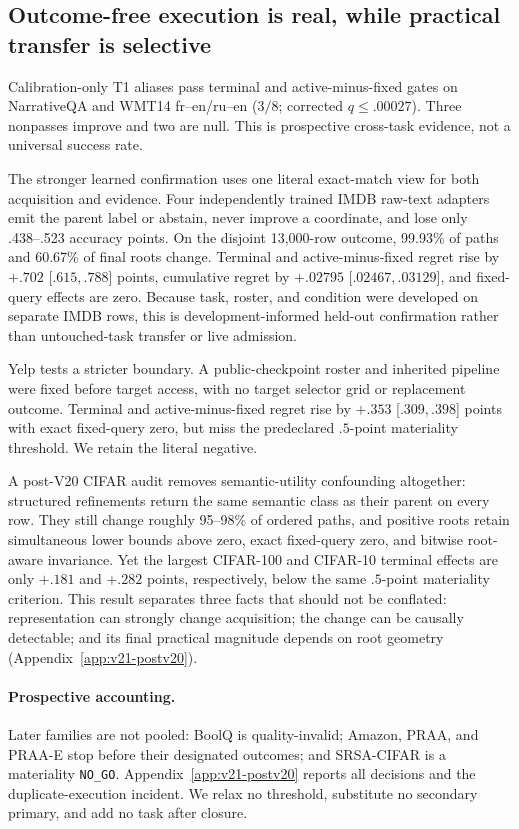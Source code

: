 \subsection{Outcome-free execution is real, while practical transfer is selective}

Calibration-only T1 aliases pass terminal and active-minus-fixed gates on NarrativeQA and WMT14 fr--en/ru--en ($3/8$; corrected $q\leq.00027$). Three nonpasses improve and two are null. This is prospective cross-task evidence, not a universal success rate.

The stronger learned confirmation uses one literal exact-match view for both acquisition and evidence. Four independently trained IMDB raw-text adapters emit the parent label or abstain, never improve a coordinate, and lose only .438--.523 accuracy points. On the disjoint 13,000-row outcome, 99.93\% of paths and 60.67\% of final roots change. Terminal and active-minus-fixed regret rise by $+.702$ [$.615,.788$] points, cumulative regret by $+.02795$ [$.02467,.03129$], and fixed-query effects are zero. Because task, roster, and condition were developed on separate IMDB rows, this is development-informed held-out confirmation rather than untouched-task transfer or live admission.

Yelp tests a stricter boundary. A public-checkpoint roster and inherited pipeline were fixed before target access, with no target selector grid or replacement outcome. Terminal and active-minus-fixed regret rise by $+.353$ [$.309,.398$] points with exact fixed-query zero, but miss the predeclared $.5$-point materiality threshold. We retain the literal negative.

A post-V20 CIFAR audit removes semantic-utility confounding altogether: structured refinements return the same semantic class as their parent on every row. They still change roughly 95--98\% of ordered paths, and positive roots retain simultaneous lower bounds above zero, exact fixed-query zero, and bitwise root-aware invariance. Yet the largest CIFAR-100 and CIFAR-10 terminal effects are only $+.181$ and $+.282$ points, respectively, below the same $.5$-point materiality criterion. This result separates three facts that should not be conflated: representation can strongly change acquisition; the change can be causally detectable; and its final practical magnitude depends on root geometry (Appendix~\ref{app:v21-postv20}).

\paragraph{Prospective accounting.}
Later families are not pooled: BoolQ is quality-invalid; Amazon, PRAA, and PRAA-E stop before their designated outcomes; and SRSA-CIFAR is a materiality \texttt{NO\_GO}. Appendix~\ref{app:v21-postv20} reports all decisions and the duplicate-execution incident. We relax no threshold, substitute no secondary primary, and add no task after closure.

